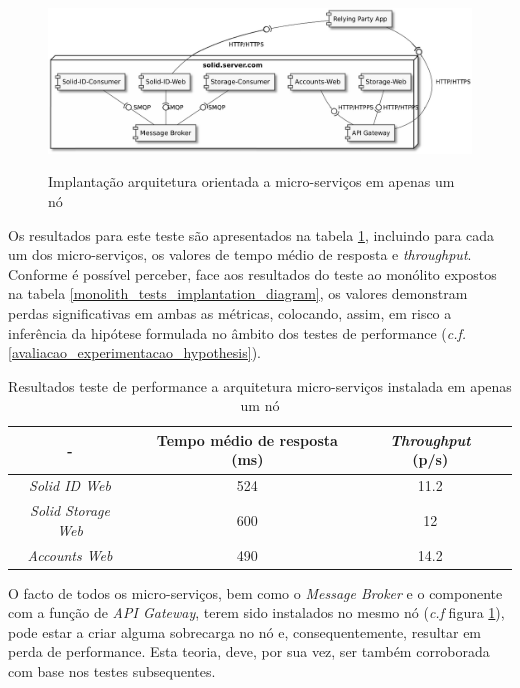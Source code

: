 \begin{figure}[H]
    \begin{center}
    \label{figure_micro_services_tests_1_implantation_diagram}
    \includegraphics[width=1 \textwidth]{figures/microservices_tests1.eps}
    \caption{Implantação arquitetura orientada a micro-serviços em apenas um nó}
    \end{center}
\end{figure}


Os resultados para este teste são apresentados na tabela \ref{r_t_m_s_1}, incluindo para cada um dos micro-serviços, os valores de tempo médio de resposta e \emph{throughput}.
Conforme é possível perceber, face aos resultados do teste ao monólito expostos na tabela \ref{monolith_tests_implantation_diagram}, os valores demonstram perdas significativas em ambas as métricas, colocando, assim, em risco a inferência da hipótese formulada no âmbito dos testes de performance (\emph{c.f.} \ref{avaliacao_experimentacao_hypothesis}).

\begin{table}[h]
\centering
\caption{Resultados teste de performance a arquitetura micro-serviços instalada em apenas um nó}
\label{r_t_m_s_1}
\vspace{0.5cm}
\begin{tabular}{c|c|c|c} 
 - & Tempo médio de resposta (ms) & \emph{Throughput} (p/s) \\
\hline                          
\emph{Solid ID Web} & 524 & 11.2 \\
\emph{Solid Storage Web} & 600 & 12 \\
 \emph{Accounts Web} & 490 & 14.2 \\
\end{tabular}
\end{table}

O facto de todos os micro-serviços, bem como o \emph{Message Broker} e o componente com a função de \emph{API Gateway}, terem sido instalados no mesmo nó (\emph{c.f} figura \ref{figure_micro_services_tests_1_implantation_diagram}), pode estar a criar alguma sobrecarga no nó e, consequentemente, resultar em perda de performance. Esta teoria, deve, por sua vez, ser também corroborada com base nos testes subsequentes.

